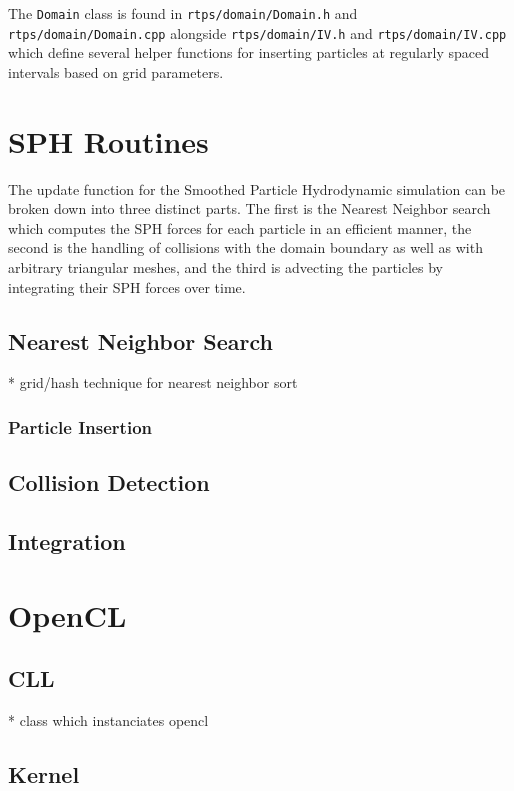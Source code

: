 The \verb|Domain| class is found in \verb|rtps/domain/Domain.h| and
\verb|rtps/domain/Domain.cpp| alongside \verb|rtps/domain/IV.h| and
\verb|rtps/domain/IV.cpp| which define several helper functions for inserting
particles at regularly spaced intervals based on grid parameters.



\section{SPH Routines}

The update function for the Smoothed Particle Hydrodynamic simulation can be
broken down into three distinct parts. The first is the Nearest Neighbor search
which computes the SPH forces for each particle in an efficient manner, the
second is the handling of collisions with the domain boundary as well as with
arbitrary triangular meshes, and the third is advecting the particles by
integrating their SPH forces over time. 

\subsection{Nearest Neighbor Search}
* grid/hash technique for nearest neighbor sort

\subsubsection{Particle Insertion}

\subsection{Collision Detection}


\subsection{Integration}



\section{OpenCL}
\subsection{CLL}
* class which instanciates opencl

\subsection{Kernel}


